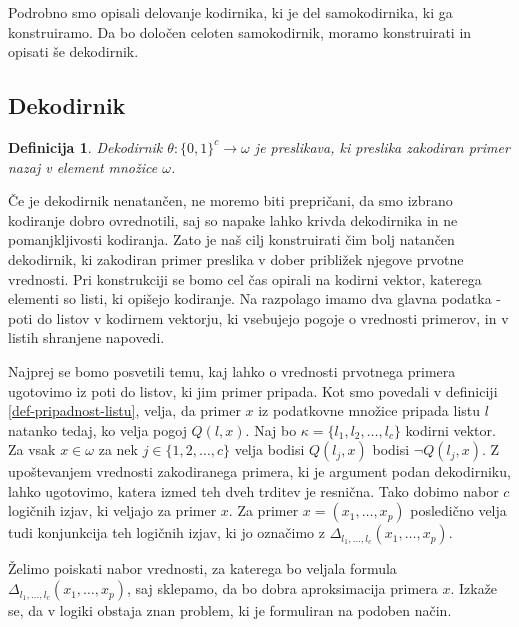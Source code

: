 \documentclass[12pt,a4paper]{article}
\newtheorem{definicija}{Definicija}
\begin{document}
Podrobno smo opisali delovanje kodirnika, ki je del samokodirnika, ki ga konstruiramo. 
Da bo določen celoten samokodirnik, moramo konstruirati in opisati še dekodirnik.



\subsection{Dekodirnik}

\begin{definicija}
	\label{def-dekodiranje}
	Dekodirnik $\theta: \{0,1\}^c \rightarrow \omega$ je preslikava, ki preslika zakodiran primer nazaj v element množice $\omega$.
\end{definicija}
Če je dekodirnik nenatančen, ne moremo biti prepričani, da smo izbrano kodiranje dobro ovrednotili, saj so napake lahko krivda dekodirnika in ne pomanjkljivosti kodiranja.
Zato je naš cilj konstruirati čim bolj natančen dekodirnik, ki zakodiran primer preslika v dober približek njegove prvotne vrednosti.
Pri konstrukciji se bomo cel čas opirali na kodirni vektor, katerega elementi so listi, ki opišejo kodiranje.
Na razpolago imamo dva glavna podatka - poti do listov v kodirnem vektorju, ki vsebujejo pogoje o vrednosti primerov, in v listih shranjene napovedi. 

Najprej se bomo posvetili temu, kaj lahko o vrednosti prvotnega primera ugotovimo iz poti do listov, ki jim primer pripada.
Kot smo povedali v definiciji \ref{def-pripadnost-listu}, velja, da primer $x$ iz podatkovne množice pripada listu $l$ natanko tedaj, ko velja pogoj $Q(l,x)$.
Naj bo $\kappa=\{l_1, l_2, \ldots, l_c\}$ kodirni vektor.
Za vsak $x \in \omega$ za nek $j \in \{1,2,\ldots,c\}$ velja bodisi $Q(l_j,x)$ bodisi $\lnot Q(l_j,x)$.
Z upoštevanjem vrednosti zakodiranega primera, ki je argument podan dekodirniku, lahko ugotovimo, katera izmed teh dveh trditev je resnična.
Tako dobimo nabor $c$ logičnih izjav, ki veljajo za primer $x$.
Za primer $x=(x_1,\ldots,x_p)$ posledično velja tudi konjunkcija teh logičnih izjav, ki jo označimo z $\Delta_{l_1,\ldots,l_c}(x_1,\ldots,x_p)$.

Želimo poiskati nabor vrednosti, za katerega bo veljala formula $\Delta_{l_1,\ldots,l_c}(x_1,\ldots,x_p)$, saj sklepamo, da bo dobra aproksimacija primera $x$.
Izkaže se, da v logiki obstaja znan problem, ki je formuliran na podoben način.
\end{document}
